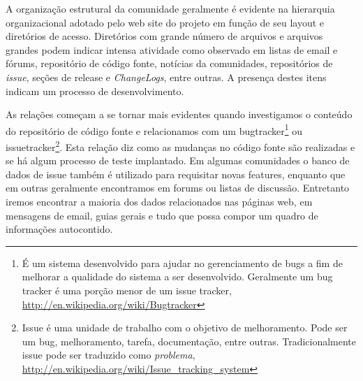 A organização estrutural da comunidade geralmente é evidente na hierarquia organizacional adotado pelo web site do projeto em função de seu layout e diretórios de acesso. Diretórios com grande número de arquivos e arquivos grandes podem indicar intensa atividade como observado em listas de email e fórums, repositório de código fonte, notícias da comunidades, repositórios de \textit{issue}, seções de release e \textit{ChangeLogs}, entre outras. A presença destes itens indicam um processo de desenvolvimento.


As relações começam a se tornar mais evidentes quando investigamos o conteúdo do repositório de código fonte e relacionamos com um bugtracker\footnote{É um sistema desenvolvido para ajudar no gerenciamento de bugs a fim de melhorar a qualidade do sistema a ser desenvolvido. Geralmente um bug tracker é uma porção menor de um issue tracker, \url{http://en.wikipedia.org/wiki/Bugtracker}} ou issuetracker\footnote{Issue é uma unidade de trabalho com o objetivo de melhoramento. Pode ser um bug, melhoramento, tarefa, documentação, entre outras. Tradicionalmente issue pode ser traduzido como \textit{problema}, \url{http://en.wikipedia.org/wiki/Issue_tracking_system}}. Esta relação diz como as mudanças no código fonte são realizadas e se há algum processo de teste implantado. Em algumas comunidades o banco de dados de issue também é utilizado para requisitar novas features, enquanto que em outras geralmente encontramos em forums ou listas de discussão. Entretanto iremos encontrar a maioria dos dados relacionados nas páginas web, em mensagens de email, guias gerais e tudo que possa compor um quadro de informações autocontido.



